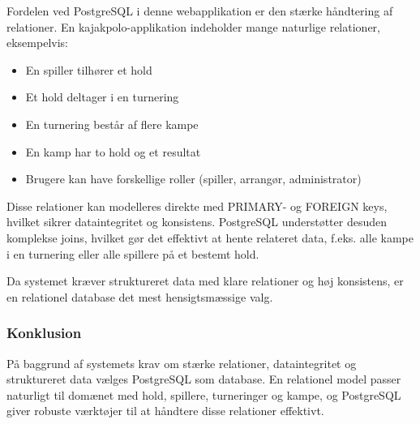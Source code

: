     Fordelen ved PostgreSQL i denne webapplikation er den stærke håndtering af relationer.
    En kajakpolo-applikation indeholder mange naturlige relationer, eksempelvis:

    \begin{itemize}
        \item En spiller tilhører et hold
        \item Et hold deltager i en turnering
        \item En turnering består af flere kampe
        \item En kamp har to hold og et resultat
        \item Brugere kan have forskellige roller (spiller, arrangør, administrator)
    \end{itemize}

    Disse relationer kan modelleres direkte med PRIMARY- og FOREIGN keys,
    hvilket sikrer dataintegritet og konsistens. PostgreSQL understøtter desuden
    komplekse joins, hvilket gør det effektivt at hente relateret data, f.eks.
    alle kampe i en turnering eller alle spillere på et bestemt hold.

    Da systemet kræver struktureret data med klare relationer og høj konsistens,
    er en relationel database det mest hensigtsmæssige valg.

    \subsubsection{Konklusion}

    På baggrund af systemets krav om stærke relationer, dataintegritet og struktureret data vælges PostgreSQL som database.
    En relationel model passer naturligt til domænet med hold, spillere, turneringer og kampe, og PostgreSQL giver robuste
    værktøjer til at håndtere disse relationer effektivt.
